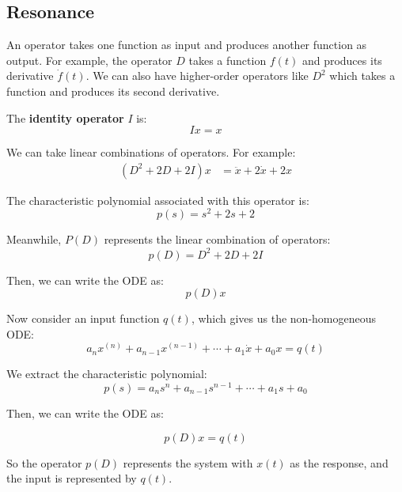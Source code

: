 \subsection{Resonance}

An operator takes one function as input and produces another function as output. For example, the operator $D$ takes a function $f(t)$ and produces its derivative $\dot f(t)$. We can also have higher-order operators like $D^2$ which takes a function and produces its second derivative.

The \textbf{identity operator} $I$ is:
\begin{equation*}
I x = x
\end{equation*}

We can take linear combinations of operators. For example:
\begin{align*}
(D^2 + 2D + 2I)x &= \ddot x + 2 \dot x + 2x
\end{align*}

The characteristic polynomial associated with this operator is:
\begin{equation*}
p(s) = s^2 + 2s + 2
\end{equation*}

Meanwhile, $P(D)$ represents the linear combination of operators:
\begin{equation*}
p(D) = D^2 + 2D + 2I
\end{equation*}

Then, we can write the ODE as:
\begin{equation*}
p(D) x
\end{equation*}

Now consider an input function $q(t)$, which gives us the non-homogeneous ODE:
\begin{equation*}
a_n x^{(n)} + a_{n-1} x^{(n-1)} + \cdots + a_1 \dot x + a_0 x = q(t)
\end{equation*}

We extract the characteristic polynomial:
\begin{equation*}
p(s) = a_n s^n + a_{n-1} s^{n-1} + \cdots + a_1 s + a_0
\end{equation*}

Then, we can write the ODE as:

\begin{equation*}
p(D) x = q(t)
\end{equation*}

So the operator $p(D)$ represents the system with $x(t)$ as the response, and the input is represented by $q(t)$. 

